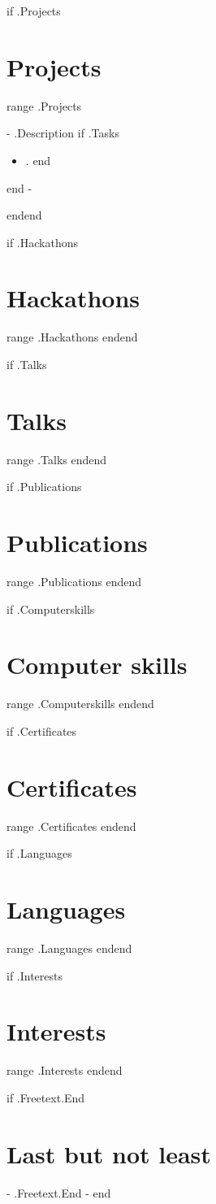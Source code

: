 \documentclass[10pt,a4paper,sans]{moderncv}
\begin{document}
{{if .Projects}}\section{Projects}
{{range .Projects}}
{ {{- .Description}} 
  {{if .Tasks}}\begin{itemize}
    {{range .Tasks}} \item {{.}}
    {{end}}\end{itemize}
  {{end -}} }
{{end}}{{end}}

{{if .Hackathons}}\section{Hackathons}
{{range .Hackathons}}
{{end}}{{end}}

{{if .Talks}}\section{Talks}
{{range .Talks}}
{{end}}{{end}}

{{if .Publications}}\section{Publications}
{{range .Publications}}
{{end}}{{end}}

{{if .Computerskills}}\section{Computer skills}
{{range .Computerskills}}
{{end}}{{end}}

{{if .Certificates }}\section{Certificates}
{{range .Certificates }}
{{end}}{{end}}

{{if .Languages}}\section{Languages}
{{range .Languages}}
{{end}}{{end}}

{{if .Interests}}\section{Interests}
{{range .Interests}}
{{end}}{{end}}

{{if .Freetext.End}}\section{Last but not least}
{{- .Freetext.End -}}
{{end}}
\end{document}
